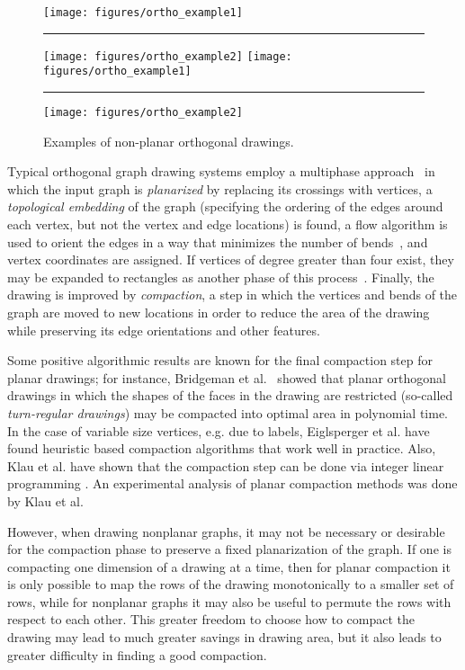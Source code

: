 \documentclass[12pt]{article}
\theoremstyle{definitions}
\begin{document}
\begin{figure}[b]
\centering
\ifFull
\texttt{[image: figures/ortho\_example1]}\rule{4em}{0em}
\texttt{[image: figures/ortho\_example2]}
\else
\texttt{[image: figures/ortho\_example1]}\rule{4em}{0em}
\texttt{[image: figures/ortho\_example2]}
\fi
\caption{Examples of non-planar orthogonal drawings.}
\label{fig:ortho-example}
\end{figure}

Typical orthogonal graph drawing systems employ a multiphase approach~\cite{BieMadTol-IJCGA-00,Eiglsperger:2001} in which the input graph is \emph{planarized} by replacing its crossings with vertices, a \emph{topological embedding} of the graph (specifying the ordering of the edges around each vertex, but not the vertex and edge locations) is found, a flow algorithm is used to orient the edges in a way that minimizes the number of bends~\cite{Tam-SJC-87}, and vertex coordinates are assigned.  If vertices of degree greater than four exist, they may be expanded to rectangles as another phase of this process~\cite{BieMadTol-IJCGA-00}. Finally, the drawing is improved by \emph{compaction}, a step in which the vertices and bends of the graph are moved to new locations in order to reduce the area of the drawing while preserving its edge orientations and other features.

Some positive algorithmic results are known for the final compaction step for planar drawings;
for instance, Bridgeman et al.~\cite{BriDiBDid-CGTA-00} showed that planar orthogonal drawings in which the shapes of the faces in the drawing are restricted (so-called \emph{turn-regular drawings}) may be compacted into optimal area in polynomial time.
In the case of variable size vertices, e.g. due to labels, Eiglsperger et al. \cite{Eiglsperger-VarVert} have found heuristic based compaction algorithms that work well in practice. Also, Klau et al. have shown that the compaction step can be done via integer linear programming \cite{Klau-Zlp}. An experimental analysis of planar compaction methods was done by Klau et al. \cite{Klau-Exp}

However, when drawing nonplanar graphs, it may not be necessary or desirable for the compaction phase to preserve a fixed planarization of the graph. If one is compacting one dimension of a drawing at a time, then for planar compaction it is only possible to map the rows of the drawing monotonically to a smaller set of rows, while for nonplanar graphs it may also be useful to permute the rows with respect to each other. This greater freedom to choose how to compact the drawing may lead to much greater savings in drawing area, but it also leads to greater difficulty in finding a good compaction.
\end{document}
